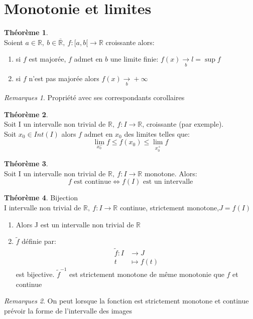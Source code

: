 \documentclass[fleqn]{article}
\theoremstyle{definition} \newtheorem*{defi}{D\'efinition}
\theoremstyle{definition} \newtheorem*{theo}{Th\'eor\`eme}
\theoremstyle{definition} \newtheorem*{prop}{Propri\'et\'e}
\theoremstyle{remark} \newtheorem*{rqs}{Remarques}
\begin{document}
\section{Monotonie et limites}
\begin{theo} $ $ \\
	Soient $a \in \mathbb{R},\ b \in \overline{\mathbb{R}},\ f:[a,b[ \rightarrow \mathbb{R}$ croissante alors:
	\begin{enumerate}
		\item si $f$ est major\'ee, $f$ admet en $b$ une limite finie: $f(x) \underset{b}{\rightarrow} l = \sup f$
		\item si $f$ n'est pas major\'ee alors $f(x) \underset{b}{\rightarrow} +\infty$
	\end{enumerate}
	\begin{rqs}
		Propri\'et\'e avec ses correspondants corollaires
	\end{rqs}
\end{theo}

\begin{theo} $ $ \\
	Soit I un intervalle non trivial de $\mathbb{R},\ f:I \rightarrow \mathbb{R}$, croissante (par exemple). \\
	Soit $x_0 \in Int(I)$ alors $f$ admet en $x_0$ des limites telles que:
	\[\lim_{x_0^-} f \leq f(x_0) \leq \lim_{x_0^+} f\]
\end{theo}

\begin{theo} $ $ \\
	Soit I un intervalle non trivial de $\mathbb{R},\ f:I\rightarrow \mathbb{R}$ monotone. Alors:
	\[f \text{ est continue} \Leftrightarrow f(I) \text{ est un intervalle}\]
\end{theo}

\begin{theo} Bijection \\
	I intervalle non trivial de $\mathbb{R},\ f:I\rightarrow \mathbb{R}$ continue, strictement monotone,$J = f(I)$
	\begin{enumerate}
		\item Alors J est un intervalle non trivial de $\mathbb{R}$
		\item $\tilde{f}$ d\'efinie par:
			\begin{align*}
				\tilde{f}: I &\rightarrow J \\
				t &\mapsto f(t)
			\end{align*}
			est bijective. $\tilde{f}^{-1}$ est strictement monotone de m\^eme monotonie que $f$ et continue
	\end{enumerate}
	\begin{rqs}
		On peut lorsque la fonction est strictement monotone et continue pr\'evoir la forme de l'intervalle des images
	\end{rqs}
\end{theo}
\end{document}
